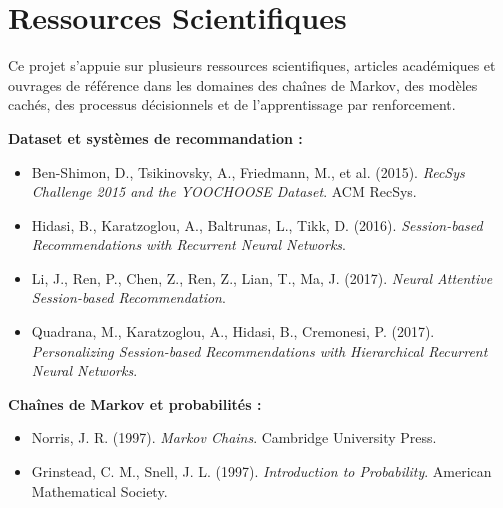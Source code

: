 \documentclass[11pt,a4paper]{article}
\begin{document}
\section{Ressources Scientifiques}

Ce projet s’appuie sur plusieurs ressources scientifiques,
articles académiques et ouvrages de référence
dans les domaines des chaînes de Markov,
des modèles cachés,
des processus décisionnels
et de l’apprentissage par renforcement.

\vspace{0.3cm}

\textbf{Dataset et systèmes de recommandation :}

\begin{itemize}

\item Ben-Shimon, D., Tsikinovsky, A., Friedmann, M., et al. (2015).
\textit{RecSys Challenge 2015 and the YOOCHOOSE Dataset}.
ACM RecSys.

\item Hidasi, B., Karatzoglou, A., Baltrunas, L., Tikk, D. (2016).
\textit{Session-based Recommendations with Recurrent Neural Networks}.

\item Li, J., Ren, P., Chen, Z., Ren, Z., Lian, T., Ma, J. (2017).
\textit{Neural Attentive Session-based Recommendation}.

\item Quadrana, M., Karatzoglou, A., Hidasi, B., Cremonesi, P. (2017).
\textit{Personalizing Session-based Recommendations with Hierarchical Recurrent Neural Networks}.

\end{itemize}

\vspace{0.3cm}

\textbf{Chaînes de Markov et probabilités :}

\begin{itemize}

\item Norris, J. R. (1997).
\textit{Markov Chains}.
Cambridge University Press.

\item Grinstead, C. M., Snell, J. L. (1997).
\textit{Introduction to Probability}.
American Mathematical Society.

\end{itemize}

\vspace{0.3cm}
\end{document}
